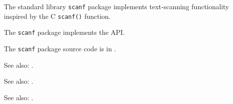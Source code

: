 
The standard library {\tt scanf} package implements text-scanning functionality 
inspired by the C {\tt scanf()} function.

The {\tt scanf} package implements the  API.

The {\tt scanf} package source code is in .

See also:  .

See also:  .

See also:  .
